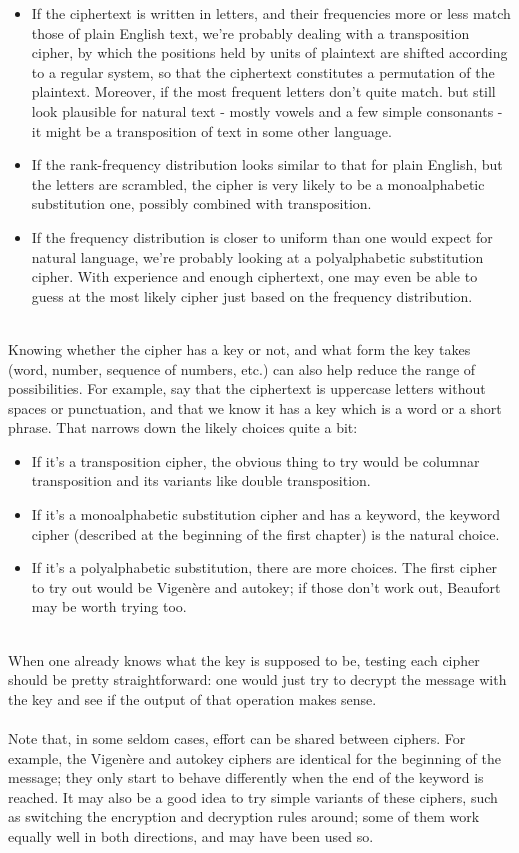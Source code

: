 \documentclass[Lau,binding=0.6cm,oneside]{sapthesis}
\begin{document}
\begin{itemize}
	\item If the ciphertext is written in letters, and their frequencies more or less match those of plain English text, we're probably dealing with a transposition cipher, by which the positions held by units of plaintext are shifted according to a regular system, so that the ciphertext constitutes a permutation of the plaintext. Moreover, if the most frequent letters don't quite match. but still look plausible for natural text - mostly vowels and a few simple consonants - it might be a transposition of text in some other language.
	\item If the rank-frequency distribution looks similar to that for plain English, but the letters are scrambled, the cipher is very likely to be a monoalphabetic substitution one, possibly combined with transposition.
	\item If the frequency distribution is closer to uniform than one would expect for natural language, we're probably looking at a polyalphabetic substitution cipher. With experience and enough ciphertext, one may even be able to guess at the most likely cipher just based on the frequency distribution.
\end{itemize}
\ \\
Knowing whether the cipher has a key or not, and what form the key takes (word, number, sequence of numbers, etc.) can also help reduce the range of possibilities. For example, say that the ciphertext is uppercase letters without spaces or punctuation, and that we know it has a key which is a word or a short phrase. That narrows down the likely choices quite a bit:

\begin{itemize}
	\item If it's a transposition cipher, the obvious thing to try would be columnar transposition and its variants like double transposition.
	\item If it's a monoalphabetic substitution cipher and has a keyword, the keyword cipher (described at the beginning of the first chapter) is the natural choice.
	\item If it's a polyalphabetic substitution, there are more choices. The first cipher to try out would be Vigenère and autokey; if those don't work out, Beaufort may be worth trying too.
\end{itemize}
\ \\
When one already knows what the key is supposed to be, testing each cipher should be pretty straightforward: one would just try to decrypt the message with the key and see if the output of that operation makes sense.\\\\
Note that, in some seldom cases, effort can be shared between ciphers. For example, the Vigenère and autokey ciphers are identical for the beginning of the message; they only start to behave differently when the end of the keyword is reached. It may also be a good idea to try simple variants of these ciphers, such as switching the encryption and decryption rules around; some of them work equally well in both directions, and may have been used so.
\end{document}
